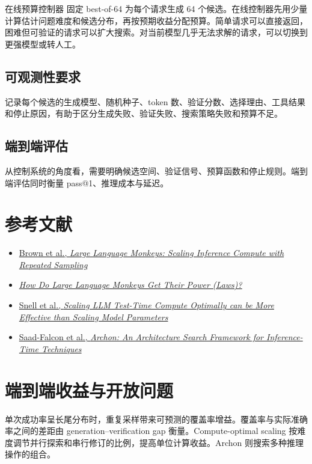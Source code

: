 \documentclass[a4paper]{article}
\begin{document}
\begin{importantbox}{在线预算控制器}
固定 best-of-64 为每个请求生成 64 个候选。在线控制器先用少量计算估计问题难度和候选分布，再按预期收益分配预算。简单请求可以直接返回，困难但可验证的请求可以扩大搜索。对当前模型几乎无法求解的请求，可以切换到更强模型或转人工。
\end{importantbox}

\subsection{可观测性要求}

记录每个候选的生成模型、随机种子、token 数、验证分数、选择理由、工具结果和停止原因，有助于区分生成失败、验证失败、搜索策略失败和预算不足。

\subsection{端到端评估}

从控制系统的角度看，需要明确候选空间、验证信号、预算函数和停止规则。端到端评估同时衡量 pass@1、推理成本与延迟。

\section{参考文献}

\begin{itemize}
    \item \href{https://arxiv.org/abs/2407.21787}{Brown et al., \emph{Large Language Monkeys: Scaling Inference Compute with Repeated Sampling}}
    \item \href{https://arxiv.org/abs/2502.17578}{\emph{How Do Large Language Monkeys Get Their Power (Laws)?}}
    \item \href{https://arxiv.org/abs/2408.03314}{Snell et al., \emph{Scaling LLM Test-Time Compute Optimally can be More Effective than Scaling Model Parameters}}
    \item \href{https://arxiv.org/abs/2409.15254}{Saad-Falcon et al., \emph{Archon: An Architecture Search Framework for Inference-Time Techniques}}
\end{itemize}

\section{端到端收益与开放问题}

单次成功率呈长尾分布时，重复采样带来可预测的覆盖率增益。覆盖率与实际准确率之间的差距由 generation--verification gap 衡量。Compute-optimal scaling 按难度调节并行探索和串行修订的比例，提高单位计算收益。Archon 则搜索多种推理操作的组合。
\end{document}
